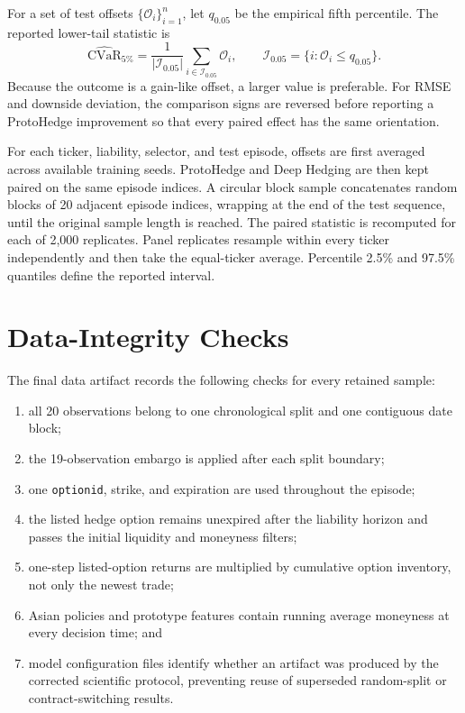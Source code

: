 \documentclass[sigconf]{acmart}
\begin{document}
For a set of test offsets $\{\mathcal{O}_i\}_{i=1}^{n}$, let
$q_{0.05}$ be the empirical fifth percentile. The reported lower-tail
statistic is
\[
\widehat{\mathrm{CVaR}}_{5\%}
=
\frac{1}{|\mathcal{I}_{0.05}|}
\sum_{i\in\mathcal{I}_{0.05}}\mathcal{O}_i,
\qquad
\mathcal{I}_{0.05}=\{i:\mathcal{O}_i\leq q_{0.05}\}.
\]
Because the outcome is a gain-like offset, a larger value is preferable. For
RMSE and downside deviation, the comparison signs are reversed before
reporting a ProtoHedge improvement so that every paired effect has the same
orientation.

For each ticker, liability, selector, and test episode, offsets are first
averaged across available training seeds. ProtoHedge and Deep Hedging are then
kept paired on the same episode indices. A circular block sample concatenates
random blocks of 20 adjacent episode indices, wrapping at the end of the test
sequence, until the original sample length is reached. The paired statistic is
recomputed for each of 2,000 replicates. Panel replicates resample within every
ticker independently and then take the equal-ticker average. Percentile 2.5\%
and 97.5\% quantiles define the reported interval.

\section{Data-Integrity Checks}
\label{app:data_checks}

The final data artifact records the following checks for every retained
sample:
\begin{enumerate}
    \item all 20 observations belong to one chronological split and one
    contiguous date block;
    \item the 19-observation embargo is applied after each split boundary;
    \item one \texttt{optionid}, strike, and expiration are used throughout
    the episode;
    \item the listed hedge option remains unexpired after the liability
    horizon and passes the initial liquidity and moneyness filters;
    \item one-step listed-option returns are multiplied by cumulative option
    inventory, not only the newest trade;
    \item Asian policies and prototype features contain running average
    moneyness at every decision time; and
    \item model configuration files identify whether an artifact was produced
    by the corrected scientific protocol, preventing reuse of superseded
    random-split or contract-switching results.
\end{enumerate}
\end{document}
